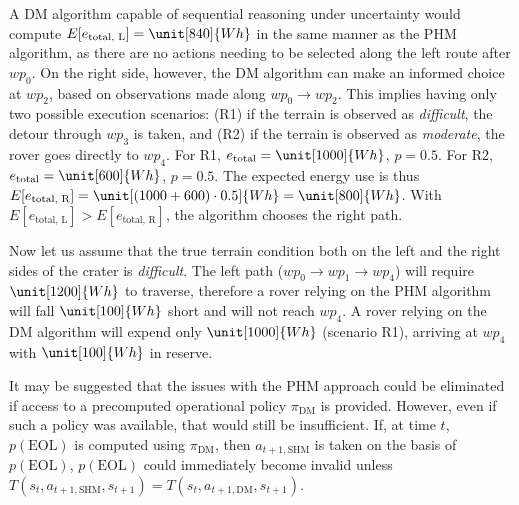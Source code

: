 A DM algorithm capable of sequential reasoning under uncertainty \cite{Kochenderfer2015} would compute $E[e_\text{total, L}] = \unit[840]{Wh}$ in the same manner as the PHM algorithm, as there are no actions needing to be selected along the left route after $wp_0$. On the right side, however, the DM algorithm can make an informed choice at $wp_2$, based on observations made along $wp_0 \rightarrow wp_2$. This implies having only two possible execution scenarios: (R1) if the terrain is observed as \textit{difficult}, the detour through $wp_3$ is taken, and (R2) if the terrain is observed as \textit{moderate}, the rover goes directly to $wp_4$. For R1, $e_\text{total}=\unit[1000]{Wh}$, $p=0.5$. For R2, $e_\text{total}=\unit[600]{Wh}$, $p=0.5$. The expected energy use is thus $E[e_\text{total, R}]=\unit[(1000+600) \cdot 0.5]{Wh} = \unit[800]{Wh}$. With $E[e_\text{total, L}] > E[e_\text{total, R}]$, the algorithm chooses the right path.

Now let us assume that the true terrain condition both on the left and the right sides of the crater is \textit{difficult}. The left path ($wp_0 \rightarrow wp_1 \rightarrow wp_4$) will require $\unit[1200]{Wh}$ to traverse, therefore a rover relying on the PHM algorithm will fall $\unit[100]{Wh}$ short and will not reach $wp_4$. A rover relying on the DM algorithm will expend only $\unit[1000]{Wh}$ (scenario R1), arriving at $wp_4$ with $\unit[100]{Wh}$ in reserve.

It may be suggested that the issues with the PHM approach could be eliminated if access to a precomputed operational policy $\pi_\text{DM}$ is provided. However, even if such a policy was available, that would still be insufficient. If, at time $t$, $p(\text{EOL})$ is computed using $\pi_\text{DM}$, then $a_{t+1,\text{SHM}}$ is taken on the basis of $p(\text{EOL})$, $p(\text{EOL})$ could immediately become invalid unless $T(s_t,a_{t+1,\text{SHM}}, s_{t+1}) = T(s_t,a_{t+1,\text{DM}}, s_{t+1})$.




